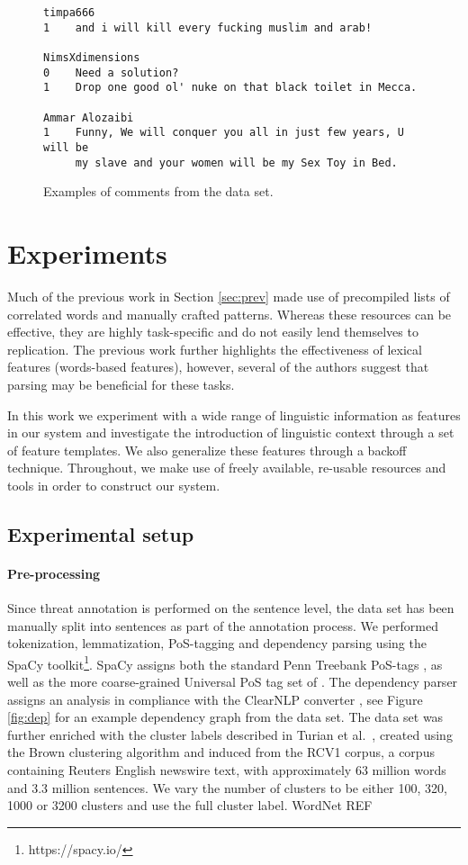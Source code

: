 \documentclass[11pt,letterpaper]{article}
\begin{document}
\begin{figure*}
\begin{verbatim}
timpa666
1    and i will kill every fucking muslim and arab!

NimsXdimensions
0    Need a solution?
1    Drop one good ol' nuke on that black toilet in Mecca.

Ammar Alozaibi
1    Funny, We will conquer you all in just few years, U will be
     my slave and your women will be my Sex Toy in Bed.

\end{verbatim}
\caption{Examples of comments from the data set.}
\label{fig:comments}
\end{figure*}

\section{Experiments}
\label{sec:exp}
Much of the previous work in Section \ref{sec:prev} made use of
precompiled lists of correlated words and manually crafted
patterns. Whereas these resources can be effective, they are highly
task-specific and do not easily lend themselves to replication.  The
previous work further highlights the effectiveness of lexical features
(words-based features), however, several of the authors suggest that parsing
may be beneficial for these tasks.

In this work we experiment with a wide range of linguistic information
as features in our system and investigate the introduction of
linguistic context through a set of feature templates. We also
generalize these features through a backoff technique. Throughout, we
make use of freely available, re-usable resources and tools in order
to construct our system.


\subsection{Experimental setup}

\paragraph{Pre-processing}Since threat annotation is performed on the sentence level, the data
set has been manually split into sentences as part of the annotation
process.  We performed tokenization, lemmatization, PoS-tagging and
dependency parsing using the SpaCy
toolkit\footnote{https://spacy.io/}.  SpaCy assigns both the standard
Penn Treebank PoS-tags \cite{Mar:San:Mar:93}, as well as the more
coarse-grained Universal PoS tag set of . The
dependency parser assigns an analysis in compliance with the ClearNLP
converter \cite{Cho:Pal:12}, see Figure \ref{fig:dep} for an example
dependency graph from the data set. The data set was further enriched
with the cluster labels described in Turian et
al.~, created using the Brown clustering
algorithm \cite{Bro:deS:Mer:92} and induced from the RCV1 corpus, a
corpus containing Reuters English newswire text, with approximately 63
million words and 3.3 million sentences. We vary the number of clusters to be either 100,
320, 1000 or 3200 clusters and use the full cluster label.
 WordNet REF
\end{document}
